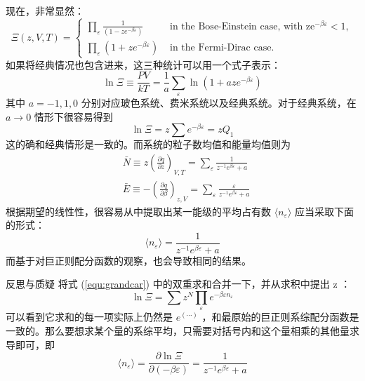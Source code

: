 现在，非常显然：
\begin{equation}
    \Xi(z, V, T)= \begin{cases}\displaystyle \prod_{\varepsilon} \frac{1}{\left(1-z e^{-\beta \varepsilon}\right)} & \text { in the Bose-Einstein case, with } \mathrm{ze}^{-\beta \varepsilon}<1, \\ \displaystyle\prod_{\varepsilon}\left(1+z e^{-\beta \varepsilon}\right) & \text { in the Fermi-Dirac case. }\end{cases}
\end{equation}
如果将经典情况也包含进来，这三种统计可以用一个式子表示：
\begin{equation}
    \ln\Xi \equiv \frac{P V}{k T}=\frac{1}{a} \sum_{\varepsilon} \ln \left(1+a z e^{-\beta \varepsilon}\right)
\end{equation}
其中 $a = -1,1,0$ 分别对应玻色系统、费米系统以及经典系统。对于经典系统，在 $a\rightarrow 0$ 情形下很容易得到
\[
    \ln\Xi = z \sum e^{-\beta\varepsilon} = zQ_1
\]
这的确和经典情形是一致的。而系统的粒子数均值和能量均值则为
\begin{equation}
    \begin{aligned}
    &\bar{N} \equiv z\left(\frac{\partial q}{\partial z}\right)_{V, T}=\sum_{\varepsilon} \frac{1}{z^{-1} e^{\beta \varepsilon}+a}\\
    &\bar{E} \equiv-\left(\frac{\partial q}{\partial \beta}\right)_{z, V}=\sum_{\varepsilon} \frac{\varepsilon}{z^{-1} e^{\beta \varepsilon}+a}
    \end{aligned}
\end{equation}
根据期望的线性性，很容易从中提取出某一能级的平均占有数 $\langle n_\varepsilon\rangle$ 应当采取下面的形式：
\begin{equation}\label{equ:zhanjushu}
    \langle n_\varepsilon\rangle = \frac{1}{z^{-1} e^{\beta \varepsilon}+a}
\end{equation}
而基于对巨正则配分函数的观察，也会导致相同的结果。

\begin{justification}{\kaishu 反思与质疑}
\kaishu \fontsize{11pt}{16pt}
\quad\quad 将式 (\ref*{equ:grandcar}) 中的双重求和合并一下，并从求积中提出 z ：
\[
    \ln\Xi =\sum z^N\prod_{\varepsilon}e^{-\beta \varepsilon n_{\varepsilon}}
\]
可以看到它求和的每一项实际上仍然是 $e^{(\cdots)}$ ，和最原始的巨正则系综配分函数是一致的。那么要想求某个量的系综平均，只需要对括号内和这个量相乘的其他量求导即可，即
\[
    \langle n_\varepsilon\rangle =\frac{\partial \ln\Xi}{\partial( -\beta \varepsilon)} = \frac{1}{z^{-1} e^{\beta \varepsilon}+a}
\]
\end{justification}

